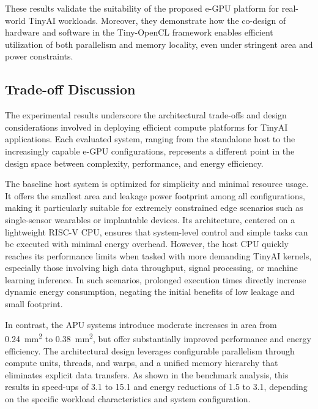                 These results validate the suitability of the proposed \mbox{e-GPU} platform for real-world TinyAI workloads. Moreover, they demonstrate how the co-design of hardware and software in the \mbox{Tiny-OpenCL} framework enables efficient utilization of both parallelism and memory locality, even under stringent area and power constraints.

        \subsection{Trade-off Discussion}
        
            The experimental results underscore the architectural trade-offs and design considerations involved in deploying efficient compute platforms for TinyAI applications. Each evaluated system, ranging from the standalone host to the increasingly capable \mbox{e-GPU} configurations, represents a different point in the design space between complexity, performance, and energy efficiency.
        
            The baseline host system is optimized for simplicity and minimal resource usage. It offers the smallest area and leakage power footprint among all configurations, making it particularly suitable for extremely constrained edge scenarios such as single-sensor wearables or implantable devices. Its architecture, centered on a lightweight RISC-V CPU, ensures that system-level control and simple tasks can be executed with minimal energy overhead. However, the host CPU quickly reaches its performance limits when tasked with more demanding TinyAI kernels, especially those involving high data throughput, signal processing, or machine learning inference. In such scenarios, prolonged execution times directly increase dynamic energy consumption, negating the initial benefits of low leakage and small footprint.
        
            In contrast, the APU systems introduce moderate increases in area from \SI{0.24}{\milli\meter\squared} to \SI{0.38}{\milli\meter\squared}, but offer substantially improved performance and energy efficiency. The architectural design leverages configurable parallelism through compute units, threads, and warps, and a unified memory hierarchy that eliminates explicit data transfers. As shown in the benchmark analysis, this results in speed-ups of \SI{3.1}{\times} to \SI{15.1}{\times} and energy reductions of \SI{1.5}{\times} to \SI{3.1}{\times}, depending on the specific workload characteristics and system configuration.
        
